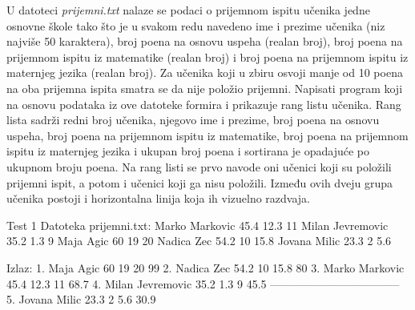 \begin{Exercise}[label=705]
U datoteci \textit{prijemni.txt} nalaze se podaci o prijemnom ispitu učenika jedne osnovne škole tako što je u svakom redu navedeno ime i prezime učenika (niz najviše 50 karaktera), broj poena na osnovu uspeha (realan broj), broj poena na prijemnom ispitu iz matematike (realan broj) i broj poena na prijemnom ispitu iz maternjeg jezika (realan broj). Za učenika koji u zbiru osvoji manje od 10 poena na oba prijemna ispita smatra se da nije položio prijemni. Napisati program koji na osnovu podataka iz ove datoteke formira i prikazuje rang listu učenika. Rang lista sadrži redni broj učenika, njegovo ime i prezime, broj poena na osnovu uspeha, broj poena na prijemnom ispitu iz matematike, broj poena na prijemnom ispitu iz maternjeg jezika i ukupan broj poena i sortirana je opadajuće po ukupnom broju poena. Na rang listi se prvo navode oni učenici koji su položili prijemni ispit, a potom i učenici koji ga nisu položili. Između ovih dveju grupa učenika postoji i horizontalna linija koja ih vizuelno razdvaja. 
\begin{maxitest}
\begin{test}{Test 1}
Datoteka prijemni.txt:
Marko Markovic 45.4 12.3 11         
Milan Jevremovic 35.2 1.3 9         
Maja Agic 60 19 20                  
Nadica Zec 54.2 10 15.8             
Jovana Milic 23.3 2 5.6

Izlaz:
1. Maja Agic 60 19 20 99
2. Nadica Zec 54.2 10 15.8 80
3. Marko Markovic 45.4 12.3 11 68.7
4. Milan Jevremovic 35.2 1.3 9 45.5
-----------------------------------
5. Jovana Milic 23.3 2 5.6 30.9
\end{test}
\end{maxitest}


\end{Exercise}

